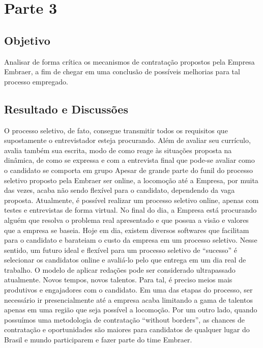 \chapter{Parte 3}

\section{Objetivo}
Analisar de forma crítica os mecanismos de contratação propostos pela Empresa Embraer, a fim de chegar em uma conclusão de possíveis
melhorias para tal processo empregado. 

\section{Resultado e Discussões}
O processo seletivo, de fato, consegue transmitir todos os requisitos que supostamente o entrevistador esteja procurando. Além de avaliar seu currículo, avalia também sua escrita, modo de como reage às situações proposta na dinâmica, de como se expressa e com a entrevista final que pode-se avaliar como o candidato se comporta em grupo
		Apesar de grande parte do funil do processo seletivo proposto pela Embraer ser online, a locomoção até a Empresa, por muita das vezes, acaba não sendo flexível para o candidato, dependendo da vaga proposta. Atualmente, é possível realizar um processo seletivo online, apenas com testes e entrevistas de forma virtual. No final do dia, a Empresa está procurando alguém que resolva o problema real apresentado e que possua a visão e valores que a empresa se baseia. Hoje em dia, existem diversos softwares que facilitam para o candidato e barateiam o custo da empresa em um processo seletivo. Nesse sentido, um futuro ideal e flexível para um processo seletivo de “sucesso” é selecionar os candidatos online e avaliá-lo pelo que entrega em um dia real de trabalho. O modelo de aplicar redações  pode ser considerado ultrapassado atualmente. Novos tempos, novos talentos. Para tal, é preciso meios mais produtivos e engajadores com o candidato. Em uma das etapas do processo, ser necessário ir presencialmente até a empresa acaba limitando a gama de talentos apenas em uma região que seja possível a locomoção. Por um outro lado, quando possuímos uma metodologia de contratação “without borders”, as chances de contratação e oportunidades são maiores para candidatos de qualquer lugar do Brasil e mundo participarem e fazer parte do time Embraer. 
	
